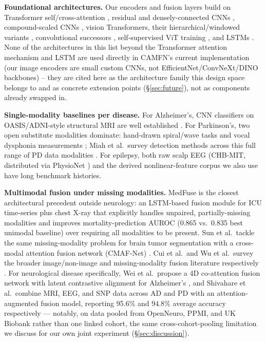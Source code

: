 \documentclass[conference]{IEEEtran}
\begin{document}
\textbf{Foundational architectures.} Our encoders and fusion layers
build on Transformer self/cross-attention \cite{vaswani2017attention},
residual and densely-connected CNNs \cite{he2016deep,huang2017densenet},
compound-scaled CNNs \cite{tan2019efficientnet,tan2021efficientnetv2},
vision Transformers, their hierarchical/windowed variants
\cite{dosovitskiy2021vit,liu2021swin}, convolutional successors
\cite{liu2022convnext}, self-supervised ViT training
\cite{caron2021dino}, and LSTMs \cite{hochreiter1997long}. None of the
architectures in this list beyond the Transformer attention mechanism
and LSTM are used directly in CAMFN's current implementation (our image
encoders are small custom CNNs, not EfficientNet/ConvNeXt/DINO
backbones) -- they are cited here as the architecture family this design
space belongs to and as concrete extension points (\S\ref{sec:future}),
not as components already swapped in.

\textbf{Single-modality baselines per disease.} For Alzheimer's, CNN
classifiers on OASIS/ADNI-style structural MRI are well established
\cite{marcus2007oasis,jack2008adni}. For Parkinson's, two open substitute
modalities dominate: hand-drawn spiral/wave tasks
\cite{razaq2025efficientnetv2s,farhah2024spiraldrawing} and vocal
dysphonia measurements \cite{little2009suitability}; Miah et al.\ survey
detection methods across this full range of PD data modalities
\cite{miah2025pdreview}. For epilepsy, both raw scalp EEG (CHB-MIT,
distributed via PhysioNet \cite{goldberger2000physionet})
\cite{shoeb2009application,cao2025hybridcnnbilstm} and the derived
nonlinear-feature corpus we also use \cite{andrzejak2001indications} have
long benchmark histories.

\textbf{Multimodal fusion under missing modalities.} MedFuse
\cite{hayat2022medfuse} is the closest architectural precedent outside
neurology: an LSTM-based fusion module for ICU time-series plus chest
X-ray that explicitly handles unpaired, partially-missing modalities and
improves mortality-prediction AUROC (0.865 vs.\ 0.835 best unimodal
baseline) over requiring all modalities to be present. Sun et al.\ tackle
the same missing-modality problem for brain tumor segmentation with a
cross-modal attention fusion network (CMAF-Net) \cite{sun2024cmafnet}.
Cui et al.\ and Wu et al.\ survey the broader image/non-image and
missing-modality fusion literature respectively
\cite{cui2022deepmultimodalreview,wu2024missing_modality_survey}.
For neurological disease specifically, Wei et al.\ propose a 4D co-attention
fusion network with latent contrastive alignment for Alzheimer's
\cite{wei2025co_attention}, and Shivahare et al.\ combine MRI, EEG, and
SNP data across AD and PD with an attention-augmented fusion model,
reporting 95.6\% and 94.8\% average accuracy respectively
\cite{shivahare2026attention} --- notably, on data pooled from OpenNeuro,
PPMI, and UK Biobank rather than one linked cohort, the same
cross-cohort-pooling limitation we discuss for our own joint experiment
(\S\ref{sec:discussion}).
\end{document}
